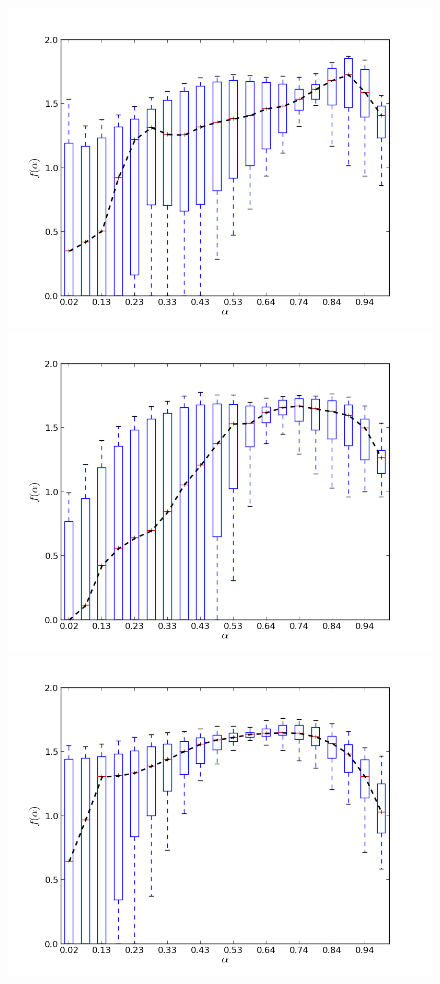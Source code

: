 \begin{figure}
\centering
\includegraphics[scale=0.4]{../images/boxpBaguetteM}
\includegraphics[scale=0.4]{../images/boxpLactalM}
\includegraphics[scale=0.4]{../images/boxpSalvadoM}

\end{figure}

